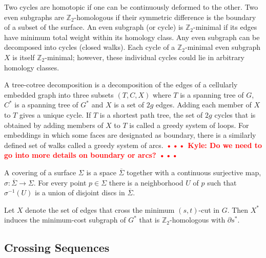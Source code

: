 \documentclass[natbib]{svcyclop}
\def\NOTE#1{\textcolor{Red}{\textbf{\textsf{••• #1 •••}}}}
\def\Z{\mathbb{Z}}
\begin{document}
Two cycles are homotopic if one can be continuously deformed to the other.  
Two even subgraphs are $\mathbb{Z}_2$-homologous if their symmetric difference is the boundary of a subset of the surface.
An even subgraph (or cycle) is $\Z_2$-minimal if its edges have minimum total weight within its homology class.
Any even subgraph can be decomposed into cycles (closed walks).
Each cycle of a $\Z_2$-minimal even subgraph $X$ is itself $\Z_2$-minimal; however, these individual cycles could lie in arbitrary homology classes.

A tree-cotree decomposition is a decomposition of the edges of a cellularly embedded graph into three subsets $(T, C, X)$ where $T$ is a spanning tree of $G$, $C^*$ is a spanning tree of $G^*$ and $X$ is a set of $2g$ edges.  
Adding each member of $X$ to $T$ gives a unique cycle.  
If $T$ is a shortest path tree, the set of $2g$ cycles that is obtained by adding members of $X$ to $T$ is called a greedy system of loops.
For embeddings in which some faces are designated as boundary, there is a similarly defined set of walks called a greedy system of arcs.
\NOTE{Kyle: Do we need to go into more details on boundary or arcs?}

A covering of a surface $\Sigma$ is a space $\overline{\Sigma}$ together with a continuous surjective map, $\sigma: \overline{\Sigma} \rightarrow \Sigma$. For every point $p \in \Sigma$ there is a neighborhood $U$ of $p$ such that $\sigma^{-1}(U)$ is a union of disjoint discs in $\overline{\Sigma}$.

Let $X$ denote the set of edges that cross the minimum $(s,t)$-cut in $G$.  Then $X^*$ induces the minimum-cost subgraph of $G^*$ that is $\Z_2$-homologous with $\partial s^*$.


\subsection{Crossing Sequences}
\end{document}
